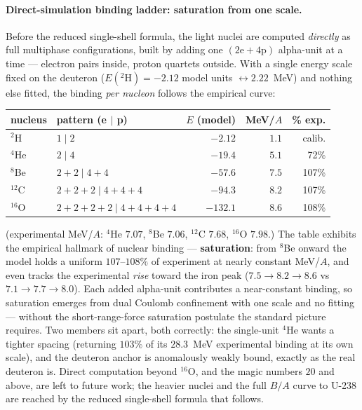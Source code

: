 \documentclass[11pt]{article}
\begin{document}
\paragraph{Direct-simulation binding ladder: saturation from one scale.}
Before the reduced single-shell formula, the light nuclei are computed \emph{directly} as full
multiphase configurations, built by adding one $(2\mathrm{e}+4\mathrm{p})$ alpha-unit at a time ---
electron pairs inside, proton quartets outside. With a single energy scale fixed on the deuteron
($E({}^2\mathrm{H}) = -2.12$ model units $\leftrightarrow 2.22$~MeV) and nothing else fitted, the
binding \emph{per nucleon} follows the empirical curve:
\begin{center}\small
\renewcommand{\arraystretch}{1.05}
\begin{tabular}{l l r r r}
\toprule
\textbf{nucleus} & \textbf{pattern (e $\mid$ p)} & \textbf{$E$ (model)} & \textbf{MeV/$A$} & \textbf{\% exp.} \\
\midrule
${}^2$H    & $1\mid 2$                                  & $-2.12$  & $1.1$ & calib. \\
${}^4$He   & $2\mid 4$                                  & $-19.4$  & $5.1$ & 72\%   \\
${}^8$Be   & $2{+}2\mid 4{+}4$                          & $-57.6$  & $7.5$ & 107\%  \\
${}^{12}$C & $2{+}2{+}2\mid 4{+}4{+}4$                  & $-94.3$  & $8.2$ & 107\%  \\
${}^{16}$O & $2{+}2{+}2{+}2\mid 4{+}4{+}4{+}4$          & $-132.1$ & $8.6$ & 108\%  \\
\bottomrule
\end{tabular}
\end{center}
\noindent(experimental MeV/$A$: ${}^4$He $7.07$, ${}^8$Be $7.06$, ${}^{12}$C $7.68$, ${}^{16}$O
$7.98$.) The table exhibits the empirical hallmark of nuclear binding --- \textbf{saturation}: from
${}^8$Be onward the model holds a uniform $107$--$108\%$ of experiment at nearly constant MeV/$A$,
and even tracks the experimental \emph{rise} toward the iron peak ($7.5 \to 8.2 \to 8.6$ vs
$7.1 \to 7.7 \to 8.0$). Each added alpha-unit contributes a near-constant binding, so saturation
emerges from dual Coulomb confinement with one scale and no fitting --- without the short-range-force
saturation postulate the standard picture requires. Two members sit apart, both correctly: the
single-unit ${}^4$He wants a tighter spacing (returning $103\%$ of its $28.3$~MeV experimental
binding at its own scale), and the deuteron anchor is anomalously weakly bound, exactly as the real
deuteron is. Direct computation beyond ${}^{16}$O, and the magic numbers $20$ and above, are left to
future work; the heavier nuclei and the full $B/A$ curve to U-238 are reached by the reduced
single-shell formula that follows.
\end{document}
